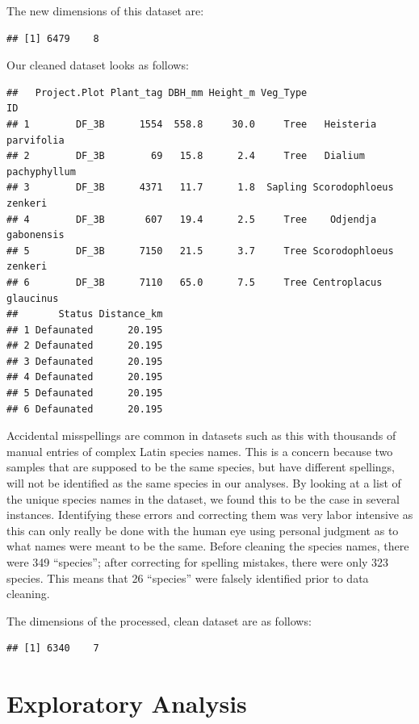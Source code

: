 \documentclass[
  12pt,
]{article}
\begin{document}
The new dimensions of this dataset are:

\begin{verbatim}
## [1] 6479    8
\end{verbatim}

Our cleaned dataset looks as follows:

\begin{verbatim}
##   Project.Plot Plant_tag DBH_mm Height_m Veg_Type                     ID
## 1        DF_3B      1554  558.8     30.0     Tree   Heisteria parvifolia
## 2        DF_3B        69   15.8      2.4     Tree   Dialium pachyphyllum
## 3        DF_3B      4371   11.7      1.8  Sapling Scorodophloeus zenkeri
## 4        DF_3B       607   19.4      2.5     Tree    Odjendja gabonensis
## 5        DF_3B      7150   21.5      3.7     Tree Scorodophloeus zenkeri
## 6        DF_3B      7110   65.0      7.5     Tree Centroplacus glaucinus
##       Status Distance_km
## 1 Defaunated      20.195
## 2 Defaunated      20.195
## 3 Defaunated      20.195
## 4 Defaunated      20.195
## 5 Defaunated      20.195
## 6 Defaunated      20.195
\end{verbatim}

Accidental misspellings are common in datasets such as this with
thousands of manual entries of complex Latin species names. This is a
concern because two samples that are supposed to be the same species,
but have different spellings, will not be identified as the same species
in our analyses. By looking at a list of the unique species names in the
dataset, we found this to be the case in several instances. Identifying
these errors and correcting them was very labor intensive as this can
only really be done with the human eye using personal judgment as to
what names were meant to be the same. Before cleaning the species names,
there were 349 ``species''; after correcting for spelling mistakes,
there were only 323 species. This means that 26 ``species'' were falsely
identified prior to data cleaning.

The dimensions of the processed, clean dataset are as follows:

\begin{verbatim}
## [1] 6340    7
\end{verbatim}

\newpage

\hypertarget{exploratory-analysis}{%
\section{Exploratory Analysis}\label{exploratory-analysis}}
\end{document}
